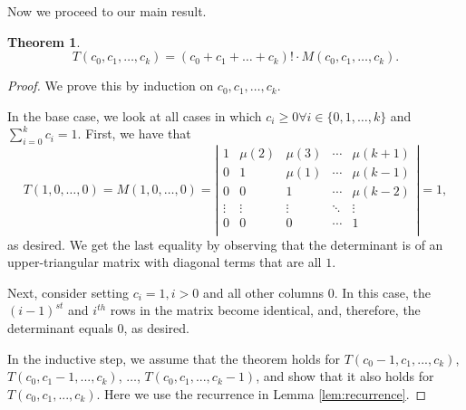 \documentclass[12pt]{amsart}
\newtheorem{theorem}{Theorem}[section]
\newcommand{\ifact}{\mu}
\newcommand{\M}{M}
\begin{document}
Now we proceed to our main result.

\begin{theorem}
$$
T(c_0, c_1, \dots, c_k) = (c_0 + c_1 + \dots + c_k)! \cdot \M(c_0, c_1, \dots, c_k).
$$
\label{thm:closedform}
\end{theorem}

\begin{proof}
We prove this by induction on $c_0, c_1, \dots, c_k$.



In the base case, we look at all cases in which $c_i \geq 0 \forall i \in \{0,1,\dots,k\}$ and $\sum_{i=0}^{k}{c_i} = 1$. First, we have that
$$
T(1,0,\dots,0) = \M(1,0,\dots,0)=\left|
\begin{matrix}
1 & \ifact(2) & \ifact(3) & \cdots & \ifact(k+1) \\
0 & 1 & \ifact(1) & \cdots & \ifact(k-1) \\
0 & 0 & 1 & \cdots & \ifact(k-2) \\
\vdots & \vdots & \vdots & \ddots & \vdots \\
0 & 0 & 0 & \cdots & 1 \\
\end{matrix} \right| = 1,
$$
as desired. We get the last equality by observing that the determinant is of an upper-triangular matrix with diagonal terms that are all $1$.

Next, consider setting $c_i = 1, i > 0$ and all other columns $0$. In this case, the $(i-1)^{st}$ and $i^{th}$ rows in the matrix become identical, and, therefore, the determinant equals $0$, as desired.

In the inductive step, we assume that the theorem holds for $T(c_0-1,c_1,...,c_k)$, $T(c_0,c_1-1,...,c_k)$, $\dots$, $T(c_0,c_1,...,c_k-1)$, and show that it also holds for $T(c_0,c_1,...,c_k)$. Here we use the recurrence in Lemma \ref{lem:recurrence}.


\end{proof}
\end{document}
